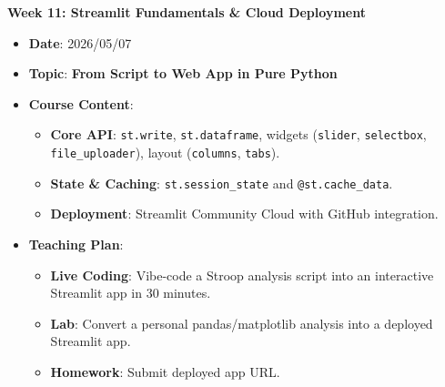 \noindent\textbf{Week 11: Streamlit Fundamentals \& Cloud Deployment}
\begin{itemize}
    \item \textbf{Date}: 2026/05/07
    \item \textbf{Topic}: \textbf{From Script to Web App in Pure Python}
    \item \textbf{Course Content}:
    \begin{itemize}
        \item \textbf{Core API}: \texttt{st.write}, \texttt{st.dataframe}, widgets (\texttt{slider}, \texttt{selectbox}, \texttt{file\_uploader}), layout (\texttt{columns}, \texttt{tabs}).
        \item \textbf{State \& Caching}: \texttt{st.session\_state} and \texttt{@st.cache\_data}.
        \item \textbf{Deployment}: Streamlit Community Cloud with GitHub integration.
    \end{itemize}
    \item \textbf{Teaching Plan}:
    \begin{itemize}
        \item \textbf{Live Coding}: Vibe-code a Stroop analysis script into an interactive Streamlit app in 30 minutes.
        \item \textbf{Lab}: Convert a personal pandas/matplotlib analysis into a deployed Streamlit app.
        \item \textbf{Homework}: Submit deployed app URL.
    \end{itemize}
\end{itemize}

